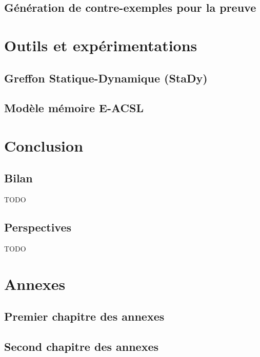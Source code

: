 \documentclass[french]{spimufcphdthesis}
\begin{document}
\chapter{Génération de contre-exemples pour la preuve}
\label{sec:ce}



\part{Outils et expérimentations}


\chapter{Greffon Statique-Dynamique (StaDy)}
\label{sec:stady}



\chapter{Modèle mémoire E-ACSL}
\label{sec:eacsl}



\part{Conclusion}


\chapter{Bilan}


TODO


\chapter{Perspectives}


TODO



\backmatter




\listoffigures
\listoftables
\listofdefinitions

\appendix
\part{Annexes}

\chapter{Premier chapitre des annexes}
\chapter{Second chapitre des annexes}
\end{document}
